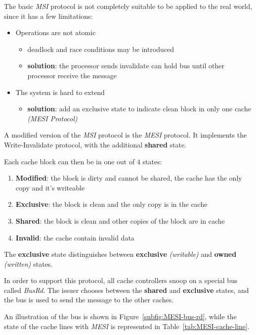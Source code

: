 \documentclass[english]{article}
\begin{document}
The basic \textit{MSI} protocol is not completely suitable to be applied to the real world, since it has a few limitations:

\begin{itemize}
  \item Operations are not atomic
        \begin{itemize}
          \item deadlock and race conditions may be introduced
          \item \textbf{solution}: the processor sends invalidate can hold bus until other processor receive the message
        \end{itemize}
  \item The system is hard to extend
        \begin{itemize}
          \item \textbf{solution}: add an exclusive state to indicate clean block in only one cache \textit{(MESI Protocol)}
        \end{itemize}
\end{itemize}

\bigskip
A modified version of the \textit{MSI} protocol is the \textit{MESI} protocol.
It implements the Write-Invalidate protocol, with the additional \textbf{shared} state.

Each cache block can then be in one out of \(4\) states:

\begin{enumerate}
  \item \textbf{Modified}: the block is dirty and cannot be shared, the cache has the only copy and it's writeable
  \item \textbf{Exclusive}: the block is clean and the only copy is in the cache
  \item \textbf{Shared}: the block is clean and other copies of the block are in cache
  \item \textbf{Invalid}: the cache contain invalid data
\end{enumerate}

The \textbf{exclusive} state distinguishes between \textbf{exclusive} \textit{(writable)} and \textbf{owned} \textit{(written)} states.

In order to support this protocol, all cache controllers snoop on a special bus called \textit{BusRd}.
The issuer chooses between the \textbf{shared} and \textbf{exclusive} states, and the bus is used to send the message to the other caches.

\bigskip
An illustration of the bus is shown in Figure~\ref{subfig:MESI-bus-rd}, while the state of the cache lines with \textit{MESI} is represented in Table~\ref{tab:MESI-cache-line}.
\end{document}
